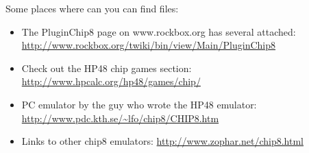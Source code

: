 Some places where can you can find  files:
\begin{itemize}
\item The PluginChip8 page on www.rockbox.org has several attached:
\url{http://www.rockbox.org/twiki/bin/view/Main/PluginChip8}
\item Check out the HP48 chip games section:
\url{http://www.hpcalc.org/hp48/games/chip/}
\item PC emulator by the guy who wrote the HP48 emulator:
\url{http://www.pdc.kth.se/~lfo/chip8/CHIP8.htm}
\item Links to other chip8 emulators: 
\url{http://www.zophar.net/chip8.html}
\end{itemize}
